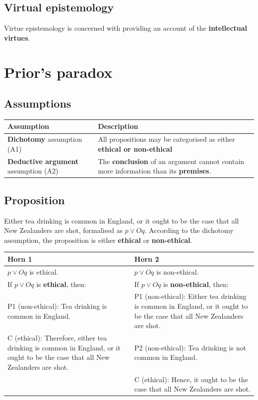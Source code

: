 \documentclass[11pt]{article}
\begin{document}
\subsection{Virtual epistemology}
\label{sec:orga935093}
Virtue epistemology is concerned with providing an account of the \textbf{intellectual virtues}.

 \newpage
\section{Prior's paradox}
\label{sec:org5aeeadd}

\subsection{Assumptions}
\label{sec:org0d96c1c}
\begin{center}
\begin{tabular}{|m{5em}|m{25em}|}
\hline
Assumption & Description\\
\hline
\textbf{Dichotomy} assumption (A1) & All propositions may be categorised as either \textbf{ethical or non-ethical}\\
\hline
\textbf{Deductive argument} assumption (A2) & The \textbf{conclusion} of an argument cannot contain more information than its \textbf{premises}.\\
\hline
\end{tabular}
\end{center}
\subsection{Proposition}
\label{sec:orgfe5d51e}
Either tea drinking is common in England, or it ought to be the case that all New Zealanders are shot, formalised as \(p \vee Oq\). According to the dichotomy assumption, the proposition is either \textbf{ethical} or \textbf{non-ethical}.

\begin{center}
\begin{tabularx}{\textwidth}{|X|X|}
\hline
Horn 1 & Horn 2\\
\hline
\(p \vee Oq\) is ethical. & \(p \vee Oq\) is non-ethical.\\
\hline
If \(p \vee Oq\) is \textbf{ethical}, then: & If \(p \vee Oq\) is \textbf{non-ethical}, then:\\
P1 (non-ethical): Tea drinking is common in England. & P1 (non-ethical): Either tea drinking is common in England, or it ought to be the case that all New Zealanders are shot.\\
C (ethical): Therefore, either tea drinking is common in England, or it ought to be the case that all New Zealanders are shot. & P2 (non-ethical): Tea drinking is not common in England.\\
 & C (ethical): Hence, it ought to be the case that all New Zealanders are shot.\\
\hline
\end{tabularx}
\end{center}
 \newpage
\end{document}
